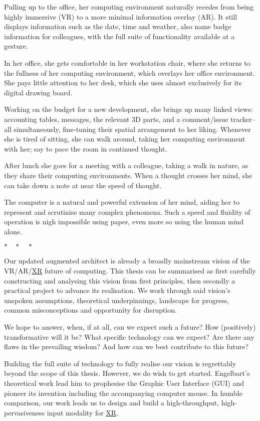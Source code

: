 \documentclass[logo,bsc,singlespacing,parskip]{infthesis}
\newcommand{\threestars}{\begin{center}$ {\ast}\quad{\ast}\quad{\ast} $\end{center}}
\begin{document}
Pulling up to the office, her computing environment naturally recedes from being highly immersive (VR) to a more minimal information overlay (AR).
It still displays information such as the date, time and weather, also name badge information for colleagues, with the full suite of functionality available at a gesture.

In her office, she gets comfortable in her workstation chair, where she returns to the fullness of her computing environment, which overlays her office environment.
She pays little attention to her desk, which she uses almost exclusively for its digital drawing board.

Working on the budget for a new development, she brings up many linked views: accounting tables, messages, the relevant 3D parts, and a comment/issue tracker-- all simultaneously, fine-tuning their spatial arrangement to her liking.
Whenever she is tired of sitting, she can walk around, taking her computing environment with her; say to pace the room in continued thought.

After lunch she goes for a meeting with a colleague, taking a walk in nature, as they share their computing environments.
When a thought crosses her mind, she can take down a note at near the speed of thought.

The computer is a natural and powerful extension of her mind, aiding her to represent and scrutinise many complex phenomena.
Such a speed and fluidity of operation is nigh impossible using paper, even more so using the human mind alone.

\threestars
Our updated augmented architect is already a broadly mainstream vision of the VR/AR/\hyperref[orgf7f8e78]{XR} future of computing.
This thesis can be summarised as first carefully constructing and analysing this vision from first principles, then secondly a practical project to advance its realisation.
We work through said vision's unspoken assumptions, theoretical underpinnings, landscape for progress, common misconceptions and opportunity for disruption.

We hope to answer, when, if at all, can we expect such a future?
How (positively) transformative will it be?
What specific technology can we expect?
Are there any flaws in the prevailing wisdom? 
And how can we best contribute to this future?

Building the full suite of technology to fully realise our vision is regrettably beyond the scope of this thesis.
However, we do wish to get started.
Engelbart's theoretical work \autocite{engelbartAugmentingHumanIntellect1962}  lead him to prophesise the Graphic User Interface (GUI) and pioneer its invention including the accompanying computer mouse.
In humble comparison, our work leads us to design and build a high-throughput, high-pervasiveness input modality for \hyperref[orgf7f8e78]{XR}.
\end{document}

